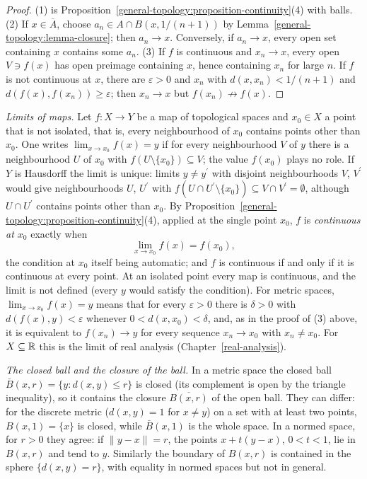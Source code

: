 \begin{proof}
(1) is Proposition~\ref{general-topology:proposition-continuity}(4) with balls. (2) If $x \in \overline{A}$, choose $a_n \in A \cap B(x, 1/(n+1))$ by
Lemma~\ref{general-topology:lemma-closure}; then $a_n \to x$. Conversely, if $a_n \to x$, every open set containing $x$ contains some $a_n$.
(3) If $f$ is continuous and $x_n \to x$, every open $V \ni f(x)$ has open preimage containing $x$, hence containing $x_n$ for large $n$.
If $f$ is not continuous at $x$, there are $\varepsilon > 0$ and $x_n$ with $d(x, x_n) < 1/(n+1)$ and $d(f(x), f(x_n)) \geq \varepsilon$; then
$x_n \to x$ but $f(x_n) \not\to f(x)$.
\end{proof}

\begin{remark}\label{general-topology:remark-limits-continuity}
\emph{Limits of maps.} Let $f \colon X \to Y$ be a map of topological spaces and $x_0 \in X$ a point that is not isolated, that is, every neighbourhood of $x_0$ contains points other than
$x_0$. One writes $\lim_{x \to x_0}f(x) = y$ if for every neighbourhood $V$ of $y$ there is a neighbourhood $U$ of $x_0$ with $f(U \setminus \{x_0\}) \subseteq V$; the value $f(x_0)$ plays no
role. If $Y$ is Hausdorff the limit is unique: limits $y \neq y^{\prime}$ with disjoint neighbourhoods $V$, $V^{\prime}$ would give neighbourhoods $U$, $U^{\prime}$ with $f(U \cap U^{\prime} \setminus
\{x_0\}) \subseteq V \cap V^{\prime} = \emptyset$, although $U \cap U^{\prime}$ contains points other than $x_0$. By Proposition~\ref{general-topology:proposition-continuity}(4), applied at the single
point $x_0$, $f$ is \emph{continuous at $x_0$} exactly when
\[
\lim_{x \to x_0}f(x) = f(x_0),
\]
the condition at $x_0$ itself being automatic; and $f$ is continuous if and only if it is continuous at every point. At an isolated point every map is continuous, and the limit is not
defined (every $y$ would satisfy the condition). For metric spaces, $\lim_{x \to x_0}f(x) = y$ means that for every $\varepsilon > 0$ there is $\delta > 0$ with $d(f(x), y) < \varepsilon$ whenever
$0 < d(x, x_0) < \delta$, and, as in the proof of (3) above, it is equivalent to $f(x_n) \to y$ for every sequence $x_n \to x_0$ with $x_n \neq x_0$. For $X \subseteq \mathbb{R}$ this is the limit of
real analysis (Chapter~\ref{real-analysis}).
\end{remark}

\begin{example}\label{general-topology:example-closed-ball}
\emph{The closed ball and the closure of the ball.} In a metric space the closed ball $\bar B(x, r) = \{y : d(x, y) \leq r\}$ is closed (its complement is open by the triangle inequality), so it
contains the closure $\overline{B(x, r)}$ of the open ball. They can differ: for the discrete metric ($d(x, y) = 1$ for $x \neq y$) on a set with at least two points, $B(x, 1) = \{x\}$ is closed, while
$\bar B(x, 1)$ is the whole space. In a normed space, for $r > 0$ they agree: if $\|y - x\| = r$, the points $x + t(y - x)$, $0 < t < 1$, lie in $B(x, r)$ and tend to $y$. Similarly the boundary of
$B(x, r)$ is contained in the sphere $\{d(x, y) = r\}$, with equality in normed spaces but not in general.
\end{example}

